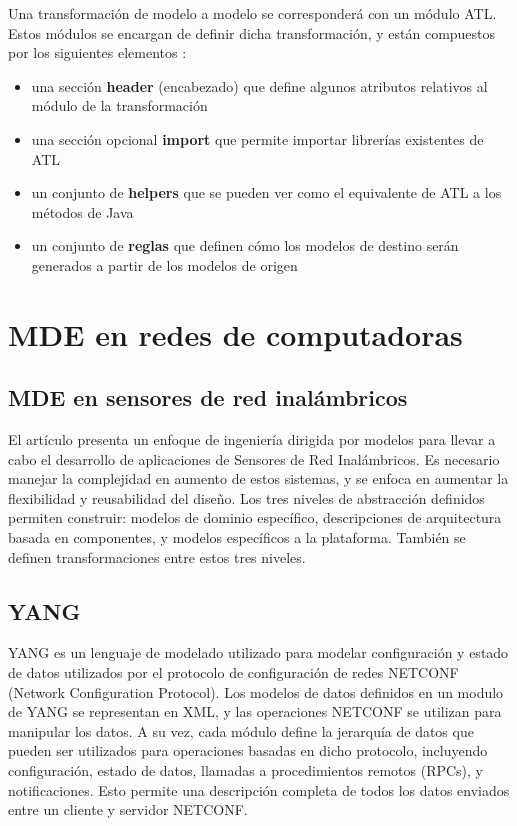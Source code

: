 Una transformación de modelo a modelo se corresponderá con un módulo ATL. Estos módulos se encargan de definir dicha transformación, y están compuestos por los siguientes elementos \cite{atloverview}:

\begin{itemize}
    \item una sección \textbf{header} (encabezado) que define algunos atributos relativos al módulo de la transformación
    \item una sección opcional \textbf{import} que permite importar librerías existentes de ATL
    \item un conjunto de \textbf{helpers} que se pueden ver como el equivalente de ATL a los métodos de Java
    \item un conjunto de \textbf{reglas} que definen cómo los modelos de destino serán generados a partir de los modelos de origen
\end{itemize}

\section{MDE en redes de computadoras}
\subsection{MDE en sensores de red inalámbricos}
El artículo \cite{essaadi2017mde} presenta un enfoque de ingeniería dirigida por modelos para llevar a cabo el desarrollo de aplicaciones de Sensores de Red Inalámbricos. Es necesario manejar la complejidad en aumento de estos sistemas, y se enfoca en aumentar la flexibilidad y reusabilidad del diseño.
Los tres niveles de abstracción definidos permiten construir: modelos de dominio específico, descripciones de arquitectura basada en componentes, y modelos específicos a la plataforma. También se definen transformaciones entre estos tres niveles.

\subsection{YANG}
YANG es un lenguaje de modelado utilizado para modelar configuración y estado de datos utilizados por el protocolo de configuración de redes NETCONF (Network Configuration Protocol).
Los modelos de datos definidos en un modulo de YANG se representan en XML, y las operaciones NETCONF se utilizan para manipular los datos.
A su vez, cada módulo define la jerarquía de datos que pueden ser utilizados para operaciones basadas en dicho protocolo, incluyendo configuración, estado de datos, llamadas a procedimientos remotos (RPCs), y notificaciones. Esto permite una descripción completa de todos los datos enviados entre un cliente y servidor NETCONF. \cite{bjorklund2010yang}

